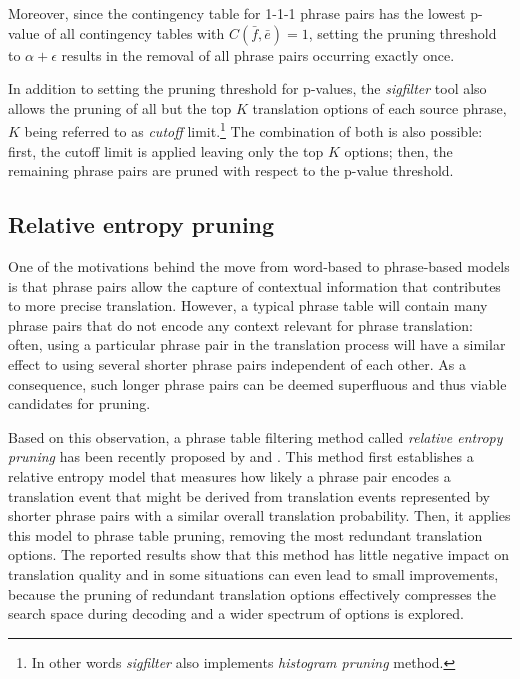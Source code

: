 Moreover, since the contingency table for 1-1-1 phrase pairs has the lowest p-value
of all contingency tables with $C(\bar{f},\bar{e}) = 1$, setting the pruning threshold
to $\alpha + \epsilon$ results in the removal of all phrase pairs occurring exactly once.

In addition to setting the pruning threshold for p-values, the \emph{sigfilter} tool
also allows the pruning of all but the top $K$ translation options of each source phrase,
$K$ being referred to as \emph{cutoff} limit.\footnote{In other words \emph{sigfilter}
also implements \emph{histogram pruning} method.}
The combination of both is also possible: first, the cutoff limit is applied leaving
only the top $K$ options; then, the remaining phrase pairs are pruned with respect to the
p-value threshold.

\subsection{Relative entropy pruning}
\label{sec:relent-pruning}

One of the motivations behind the move from word-based to phrase-based models
is that phrase pairs allow the capture of contextual information that contributes
to more precise translation.
However, a typical phrase table will contain many phrase pairs that do not
encode any context relevant for phrase translation: often, using a particular
phrase pair in the translation process will have a similar effect to using
several shorter phrase pairs independent of each other.
As a consequence, such longer phrase pairs can be deemed superfluous and thus
viable candidates for pruning.

Based on this observation, a phrase table filtering method called \emph{relative
entropy pruning} has been recently proposed by \citet{ling:relentfilter} and
\citet{zens:systcomp}.
This method first establishes a relative entropy model that measures how likely
a phrase pair encodes a translation event that might be derived from translation
events represented by shorter phrase pairs with a similar overall translation
probability. Then, it applies this model to phrase table pruning, removing
the most redundant translation options.
The reported results show that this method has little negative impact on
translation quality and in some situations can even lead to small improvements,
because the pruning of redundant translation options effectively compresses
the search space during decoding and a wider spectrum of options is explored.

